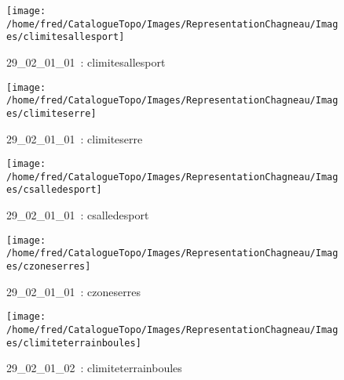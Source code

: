 \documentclass[12pt,titlepage]{book}
\begin{document}
\begin{figure}[h!]
  \hfill         %
  \begin{minipage}[t]{3cm}
    \begin{center}
      \texttt{[image: /home/fred/CatalogueTopo/Images/RepresentationChagneau/Images/climitesallesport]}
      \caption[~29\_02\_01\_01]{\small{29\_02\_01\_01~:} \tiny{climitesallesport}}\label{climitesallesport}
    \end{center}
  \end{minipage}
  \begin{minipage}[t]{3cm}
    \begin{center}
      \texttt{[image: /home/fred/CatalogueTopo/Images/RepresentationChagneau/Images/climiteserre]}
      \caption[~29\_02\_01\_01]{\small{29\_02\_01\_01~:} \tiny{climiteserre}}\label{climiteserre}
    \end{center}
  \end{minipage}
  \begin{minipage}[t]{3cm}
    \begin{center}
      \texttt{[image: /home/fred/CatalogueTopo/Images/RepresentationChagneau/Images/csalledesport]}
      \caption[~29\_02\_01\_01]{\small{29\_02\_01\_01~:} \tiny{csalledesport}}\label{csalledesport}
    \end{center}
  \end{minipage}
  \begin{minipage}[t]{3cm}
    \begin{center}
      \texttt{[image: /home/fred/CatalogueTopo/Images/RepresentationChagneau/Images/czoneserres]}
      \caption[~29\_02\_01\_01]{\small{29\_02\_01\_01~:} \tiny{czoneserres}}\label{czoneserres}
    \end{center}
  \end{minipage}
  \begin{minipage}[t]{3cm}
    \begin{center}
      \texttt{[image: /home/fred/CatalogueTopo/Images/RepresentationChagneau/Images/climiteterrainboules]}
      \caption[~29\_02\_01\_02]{\small{29\_02\_01\_02~:} \tiny{climiteterrainboules}}\label{climiteterrainboules}
    \end{center}
  \end{minipage}

\end{figure}
\end{document}
